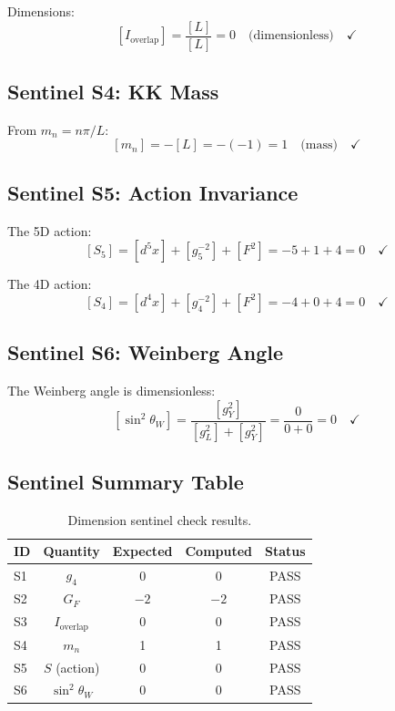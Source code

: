 \documentclass[11pt,a4paper]{article}
\begin{document}
Dimensions:
\begin{equation}
\label{eq:s3-check}
[I_{\text{overlap}}] = \frac{[L]}{[L]} = 0 \quad \text{(dimensionless)} \quad \checkmark
\end{equation}

\subsection{Sentinel S4: KK Mass}
\label{subsec:sentinel-kk}

From $m_n = n\pi / L$:
\begin{equation}
\label{eq:s4-check}
[m_n] = -[L] = -(-1) = 1 \quad \text{(mass)} \quad \checkmark
\end{equation}

\subsection{Sentinel S5: Action Invariance}
\label{subsec:sentinel-action}

The 5D action:
\begin{equation}
\label{eq:s5-5d}
[S_5] = [d^5x] + [g_5^{-2}] + [F^2] = -5 + 1 + 4 = 0 \quad \checkmark
\end{equation}

The 4D action:
\begin{equation}
\label{eq:s5-4d}
[S_4] = [d^4x] + [g_4^{-2}] + [F^2] = -4 + 0 + 4 = 0 \quad \checkmark
\end{equation}

\subsection{Sentinel S6: Weinberg Angle}
\label{subsec:sentinel-weinberg}

The Weinberg angle is dimensionless:
\begin{equation}
\label{eq:s6-check}
[\sin^2\theta_W] = \frac{[g_Y^2]}{[g_L^2] + [g_Y^2]} = \frac{0}{0 + 0} = 0 \quad \checkmark
\end{equation}

\subsection{Sentinel Summary Table}
\label{subsec:sentinel-table}

\begin{table}[ht]
\centering
\caption{Dimension sentinel check results.}
\label{tab:sentinel-summary}
\begin{tabular}{lcccc}
\toprule
ID & Quantity & Expected & Computed & Status \\
\midrule
S1 & $g_4$ & 0 & 0 & PASS \\
S2 & $G_F$ & $-2$ & $-2$ & PASS \\
S3 & $I_{\text{overlap}}$ & 0 & 0 & PASS \\
S4 & $m_n$ & 1 & 1 & PASS \\
S5 & $S$ (action) & 0 & 0 & PASS \\
S6 & $\sin^2\theta_W$ & 0 & 0 & PASS \\
\bottomrule
\end{tabular}
\end{table}
\end{document}
